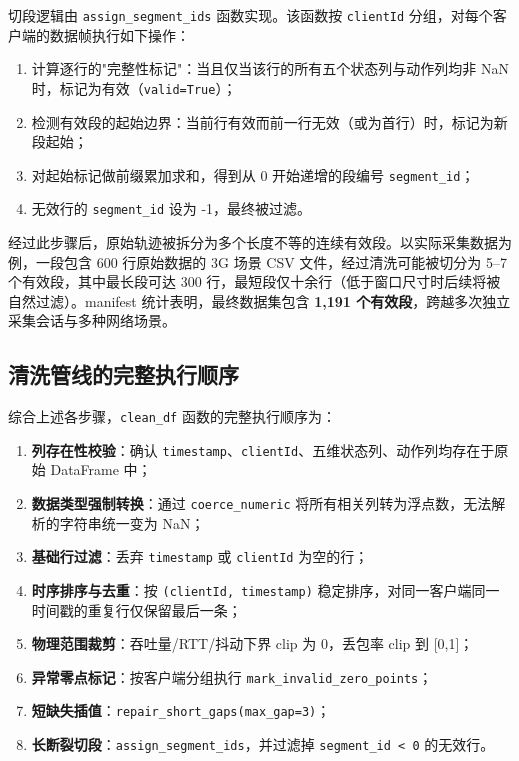 切段逻辑由 \texttt{assign\_segment\_ids} 函数实现。该函数按 \texttt{clientId} 分组，对每个客户端的数据帧执行如下操作：

\begin{enumerate}
    \item 计算逐行的"完整性标记"：当且仅当该行的所有五个状态列与动作列均非 NaN 时，标记为有效（\texttt{valid=True}）；
    \item 检测有效段的起始边界：当前行有效而前一行无效（或为首行）时，标记为新段起始；
    \item 对起始标记做前缀累加求和，得到从 0 开始递增的段编号 \texttt{segment\_id}；
    \item 无效行的 \texttt{segment\_id} 设为 -1，最终被过滤。
\end{enumerate}

经过此步骤后，原始轨迹被拆分为多个长度不等的连续有效段。以实际采集数据为例，一段包含 600 行原始数据的 3G 场景 CSV 文件，经过清洗可能被切分为 5–7 个有效段，其中最长段可达 300 行，最短段仅十余行（低于窗口尺寸时后续将被自然过滤）。manifest 统计表明，最终数据集包含 \textbf{1,191 个有效段}，跨越多次独立采集会话与多种网络场景。

\subsection{清洗管线的完整执行顺序}

综合上述各步骤，\texttt{clean\_df} 函数的完整执行顺序为：

\begin{enumerate}
    \item \textbf{列存在性校验}：确认 \texttt{timestamp}、\texttt{clientId}、五维状态列、动作列均存在于原始 DataFrame 中；
    \item \textbf{数据类型强制转换}：通过 \texttt{coerce\_numeric} 将所有相关列转为浮点数，无法解析的字符串统一变为 NaN；
    \item \textbf{基础行过滤}：丢弃 \texttt{timestamp} 或 \texttt{clientId} 为空的行；
    \item \textbf{时序排序与去重}：按 \texttt{(clientId, timestamp)} 稳定排序，对同一客户端同一时间戳的重复行仅保留最后一条；
    \item \textbf{物理范围裁剪}：吞吐量/RTT/抖动下界 clip 为 0，丢包率 clip 到 [0,1]；
    \item \textbf{异常零点标记}：按客户端分组执行 \texttt{mark\_invalid\_zero\_points}；
    \item \textbf{短缺失插值}：\texttt{repair\_short\_gaps(max\_gap=3)}；
    \item \textbf{长断裂切段}：\texttt{assign\_segment\_ids}，并过滤掉 \texttt{segment\_id < 0} 的无效行。
\end{enumerate}

